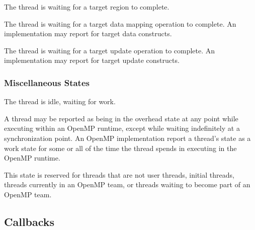 \begin{description}

\item {} 

  The thread is waiting for a target region to complete.
  
\item {} 

  The thread is waiting for a target data mapping operation to complete. 
  An implementation may report  
  for target data constructs.

\item {} 

  The thread is waiting for a target  update operation to complete. 
  An implementation may report  
  for target update constructs.

\end{description}


\subsubsection{Miscellaneous States}

\begin{description}
\item {} 

  The thread is idle, waiting for work.

\item {} 

  A thread may be reported as being in the overhead state at any point while 
  executing within an OpenMP runtime, except while waiting indefinitely
  at a synchronization point.
  An OpenMP implementation report a thread's state as a work state for
  some or all of the time the thread spends in executing in the OpenMP runtime.

\item {} 

  This state is reserved for threads that are not user threads,
  initial threads, threads currently in an OpenMP team, or threads
  waiting to become part of an OpenMP team.

\end{description}

\subsection{Callbacks}
\label{sec:ompt_callbacks_t}

